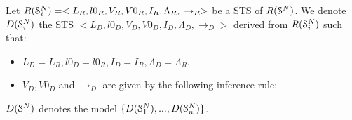 
\begin{definition}
    Let $R(\EuScript{S}_i^{N})=<L_R,l0_R,V_R,V0_R,I_R,\Lambda_R,\\\rightarrow_R>$ be a STS of $R(\EuScript{S}^{N})$. We denote $D(\EuScript{S}_i^{N})$ the STS $ <L_D,l0_D,V_D,V0_D,I_D,\Lambda_D,\rightarrow_D>$ derived from $R(\EuScript{S}_i^{N})$ such that:
\begin{itemize}
    \item $L_D=L_{R}, l0_D=l0_{R}, I_D=I_{R}, \Lambda_D=\Lambda_{R}$,
    \item $V_D, V0_D$ and $\rightarrow_D$ are given by the following inference rule:
\end{itemize}

	\noindent\begin{center}
	\end{center}

    $D(\EuScript{S}^{N})$ denotes the model $\{ D(\EuScript{S}_1^{N}),...,D(\EuScript{S}_n^{N}) \}$.
\end{definition}


